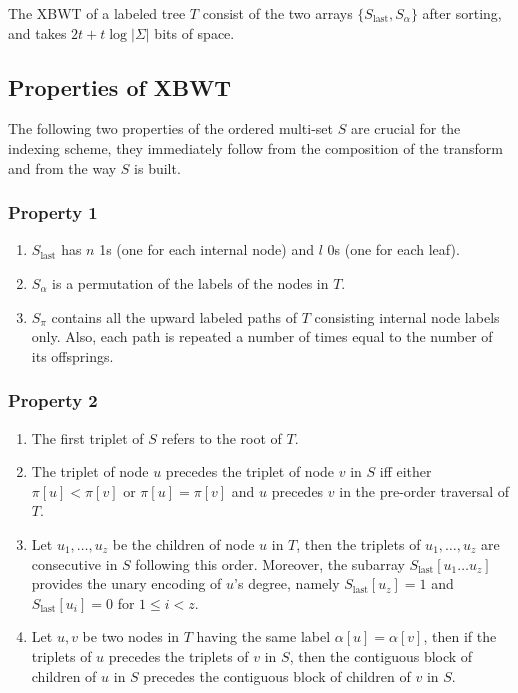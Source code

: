 \begin{teorema}
    The XBWT of a labeled tree $T$ consist of the two arrays $\{S_{\text{last}}, S_{\alpha}\}$ after sorting, and takes $2t + t \log |\Sigma|$ bits of space. 
\end{teorema}

\subsection{Properties of XBWT}
The following two properties of the ordered multi-set $S$ are crucial for the indexing scheme, they immediately follow from the composition of the transform and from the way $S$ is built.

\subsubsection{Property 1} \label{prop1}
\begin{enumerate}
    \item $S_{\text{last}}$ has $n$ 1s (one for each internal node) and $l$ 0s (one for each leaf).
    \item $S_{\alpha}$ is a permutation of the labels of the nodes in $T$.
    \item $S_{\pi}$ contains all the upward labeled paths of $T$ consisting internal node labels only. Also, each path is repeated a number of times equal to the number of its offsprings.
\end{enumerate}

\subsubsection{Property 2} \label{prop2}
\begin{enumerate}
    \item The first triplet of $S$ refers to the root of $T$.
    \item The triplet of node $u$ precedes the triplet of node $v$ in $S$ iff either $\pi[u] < \pi[v]$ or $\pi[u] = \pi[v]$ and $u$ precedes $v$ in the pre-order traversal of $T$.
    \item Let $u_1, \dots, u_z$ be the children of node $u$ in $T$, then the triplets of $u_1, \dots, u_z$ are consecutive in $S$ following this order. Moreover, the subarray $S_{\text{last}}[u_1 \dots u_z]$ provides the unary encoding of $u$'s degree, namely $S_{\text{last}}[u_z] = 1$ and $S_{\text{last}}[u_i] = 0$ for $1 \leq i < z$.
    \item Let $u, v$ be two nodes in $T$ having the same label $\alpha[u] = \alpha[v]$, then if the triplets of $u$ precedes the triplets of $v$ in $S$, then the contiguous block of children of $u$ in $S$ precedes the contiguous block of children of $v$ in $S$. 
\end{enumerate}

